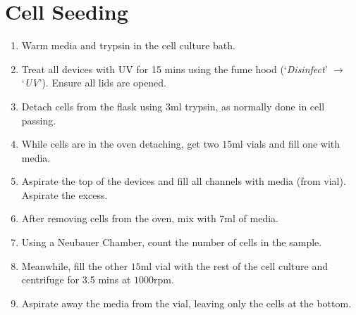 \section{Cell Seeding}

\begin{enumerate}
			 \setlength\itemsep{-0.1em}
	\item Warm media and trypsin in the cell culture bath.
	\item Treat all devices with UV for 15 mins using the fume hood (`\textit{Disinfect}' $\rightarrow$ `\textit{UV}'). Ensure all lids are opened. 
	\item Detach cells from the flask using $3  \text{ml}$ trypsin, as normally done in cell passing.
	\item While cells are in the oven detaching, get two $15  \text{ml}$ vials and fill one with media.
	\item Aspirate the top of the devices and fill all channels with media (from vial). Aspirate the excess.
	\item After removing cells from the oven, mix with $7  \text{ml}$ of media. 
	\item Using a Neubauer Chamber, count the number of cells in the sample.
	\item Meanwhile, fill the other $15  \text{ml}$ vial with the rest of the cell culture and centrifuge for 3.5 mins at $1000  \text{rpm}$.
	\item Aspirate away the media from the vial, leaving only the cells at the bottom.

\end{enumerate}
